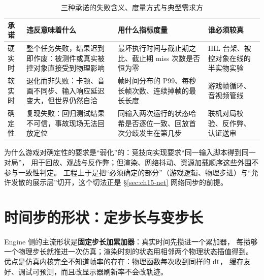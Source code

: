 \documentclass[12pt,a4paper,fontset=fandol]{ctexbook}
\newcommand{\Tp}[1]{\texttt{#1}}
\newcommand{\Lang}[1]{\textsf{#1}}
\newcommand{\DomEngine}{\Lang{Engine}}
\begin{document}
\begin{table}[htbp]
\centering
\caption{三种承诺的失败含义、度量方式与典型需求方}
\label{tab:ch15-promise}
\begin{tabular}{>{\raggedright\arraybackslash}p{} >{\raggedright\arraybackslash}p{} >{\raggedright\arraybackslash}p{} >{\raggedright\arraybackslash}p{}}
\toprule
承诺 & 违反意味着什么 & 用什么指标度量 & 谁必须较真 \\
\midrule
硬实时 & 整个任务失败，结果迟到即作废：被测件或真实被控对象直接受到物理影响 & 最坏执行时间与截止期之比、截止期 miss 次数是否恒为零 & HIL 台架、被控对象在线的半实物实验 \\
软实时 & 退化而非失败：卡顿、音画不同步、输入响应延迟变大，但世界仍然自洽 & 帧时间分布的 P99、每秒长帧次数、连续掉帧的最长长度 & 游戏帧循环、音视频管线 \\
确定性 & 复现失败：回归测试结果不可信，事故现场无法回放定位 & 同输入两次运行的状态哈希是否逐位一致、回放首次分歧发生在第几步 & 联机对局校验、反作弊、认证送审 \\
\bottomrule
\end{tabular}
\end{table}

为什么游戏对确定性的要求是``弱化''的：竞技向实现要求``同一输入脚本得到同一对局''，
用于回放、观战与反作弊；但渲染、网络抖动、资源加载顺序这些外围不参与一致性判定。
工程上于是把``必须确定的部分''（游戏逻辑、物理步进）与``允许发散的展示层''切开，这个切法正是 \S\ref{sec:ch15-net} 网络同步的前提。

\section{时间步的形状：定步长与变步长}
\label{sec:ch15-timestep}

\DomEngine{} 侧的主流形状是\textbf{固定步长加累加器}：真实时间先攒进一个累加器，
每攒够一个物理步长就推进一次仿真；渲染时刻的状态用相邻两个物理状态插值得到。
优点是仿真内核完全不知道帧率的存在：物理函数每次收到同样的 \Tp{dt}，
缓存友好、调试可预测，而且改显示器刷新率不会改轨迹。
\end{document}
